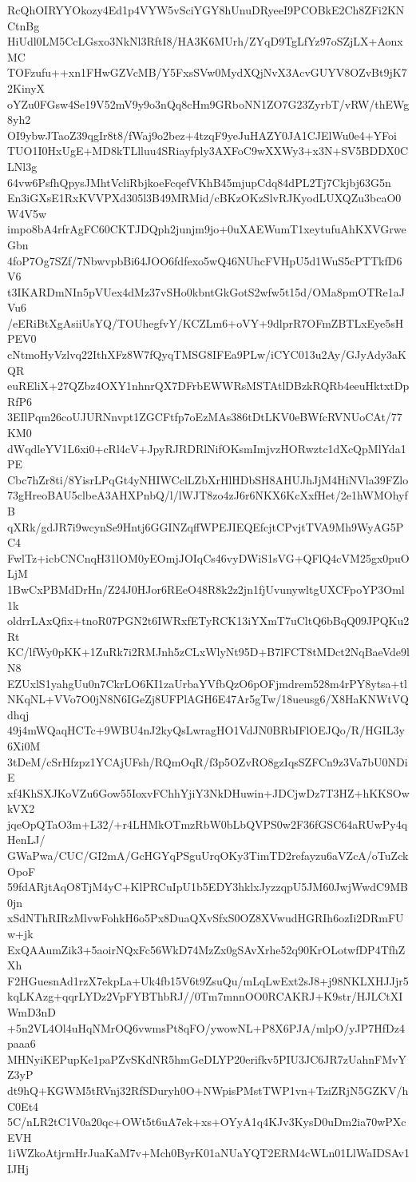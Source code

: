 RcQhOIRYYOkozy4Ed1p4VYW5vSciYGY8hUnuDRyeeI9PCOBkE2Ch8ZFi2KNCtnBg
HiUdl0LM5CcLGsxo3NkNl3RftI8/HA3K6MUrh/ZYqD9TgLfYz97oSZjLX+AonxMC
TOFzufu++xn1FHwGZVcMB/Y5FxsSVw0MydXQjNvX3AcvGUYV8OZvBt9jK72KinyX
oYZu0FGsw4Se19V52mV9y9o3nQq8cHm9GRboNN1ZO7G23ZyrbT/vRW/thEWg8yh2
OI9ybwJTaoZ39qgIr8t8/fWaj9o2bez+4tzqF9yeJuHAZY0JA1CJElWu0e4+YFoi
TUO1I0HxUgE+MD8kTLlluu4SRiayfply3AXFoC9wXXWy3+x3N+SV5BDDX0CLNl3g
64vw6PsfhQpysJMhtVcliRbjkoeFcqefVKhB45mjupCdq84dPL2Tj7Ckjbj63G5n
En3iGXsE1RxKVVPXd305l3B49MRMid/cBKzOKzSlvRJKyodLUXQZu3bcaO0W4V5w
impo8bA4rfrAgFC60CKTJDQph2junjm9jo+0uXAEWumT1xeytufuAhKXVGrweGbn
4foP7Og7SZf/7NbwvpbBi64JOO6fdfexo5wQ46NUhcFVHpU5d1WuS5cPTTkfD6V6
t3IKARDmNIn5pVUex4dMz37vSHo0kbntGkGotS2wfw5t15d/OMa8pmOTRe1aJVu6
/eERiBtXgAsiiUsYQ/TOUhegfvY/KCZLm6+oVY+9dlprR7OFmZBTLxEye5sHPEV0
cNtmoHyVzlvq22IthXFz8W7fQyqTMSG8IFEa9PLw/iCYC013u2Ay/GJyAdy3aKQR
euREliX+27QZbz4OXY1nhnrQX7DFrbEWWRsMSTAtlDBzkRQRb4eeuHktxtDpRfP6
3EIlPqm26coUJURNnvpt1ZGCFtfp7oEzMAs386tDtLKV0eBWfcRVNUoCAt/77KM0
dWqdleYV1L6xi0+cRl4cV+JpyRJRDRlNifOKsmImjvzHORwztc1dXcQpMlYda1PE
Cbc7hZr8ti/8YisrLPqGt4yNHIWCclLZbXrHlHDbSH8AHUJhJjM4HiNVla39FZlo
73gHreoBAU5clbeA3AHXPnbQ/l/lWJT8zo4zJ6r6NKX6KcXxfHet/2e1hWMOhyfB
qXRk/gdJR7i9wcynSe9Hntj6GGINZqffWPEJIEQEfcjtCPvjtTVA9Mh9WyAG5PC4
FwlTz+icbCNCnqH31lOM0yEOmjJOIqCs46vyDWiS1sVG+QFlQ4cVM25gx0puOLjM
1BwCxPBMdDrHn/Z24J0HJor6REeO48R8k2z2jn1fjUvunywltgUXCFpoYP3Oml1k
oldrrLAxQfix+tnoR07PGN2t6IWRxfETyRCK13iYXmT7uCltQ6bBqQ09JPQKu2Rt
KC/lfWy0pKK+1ZuRk7i2RMJnh5zCLxWlyNt95D+B7lFCT8tMDct2NqBaeVde9lN8
EZUxlS1yahgUu0n7CkrLO6KI1zaUrbaYVfbQzO6pOFjmdrem528m4rPY8ytsa+tl
NKqNL+VVo7O0jN8N6IGeZj8UFPlAGH6E47Ar5gTw/18ueusg6/X8HaKNWtVQdhqj
49j4mWQaqHCTc+9WBU4nJ2kyQsLwragHO1VdJN0BRbIFlOEJQo/R/HGIL3y6Xi0M
3tDeM/cSrHfzpz1YCAjUFsh/RQmOqR/f3p5OZvRO8gzIqsSZFCn9z3Va7bU0NDiE
xf4KhSXJKoVZu6Gow55IoxvFChhYjiY3NkDHuwin+JDCjwDz7T3HZ+hKKSOwkVX2
jqeOpQTaO3m+L32/+r4LHMkOTmzRbW0bLbQVPS0w2F36fGSC64aRUwPy4qHenLJ/
GWaPwa/CUC/GI2mA/GcHGYqPSguUrqOKy3TimTD2refayzu6aVZcA/oTuZckOpoF
59fdARjtAqO8TjM4yC+KlPRCuIpU1b5EDY3hklxJyzzqpU5JM60JwjWwdC9MB0jn
xSdNThRIRzMlvwFohkH6o5Px8DuaQXvSfxS0OZ8XVwudHGRIh6ozIi2DRmFUw+jk
ExQAAumZik3+5aoirNQxFc56WkD74MzZx0gSAvXrhe52q90KrOLotwfDP4TfhZXh
F2HGuesnAd1rzX7ekpLa+Uk4fb15V6t9ZsuQu/mLqLwExt2sJ8+j98NKLXHJJjr5
kqLKAzg+qqrLYDz2VpFYBThbRJ//0Tm7mnnOO0RCAKRJ+K9str/HJLCtXIWmD3nD
+5n2VL4Ol4uHqNMrOQ6vwmsPt8qFO/ywowNL+P8X6PJA/mlpO/yJP7HfDz4paaa6
MHNyiKEPupKe1paPZvSKdNR5hmGeDLYP20erifkv5PIU3JC6JR7zUahnFMvYZ3yP
dt9hQ+KGWM5tRVnj32RfSDuryh0O+NWpisPMstTWP1vn+TziZRjN5GZKV/hC0Et4
5C/nLR2tC1V0a20qc+OWt5t6uA7ek+xs+OYyA1q4KJv3KysD0uDm2ia70wPXcEVH
1iWZkoAtjrmHrJuaKaM7v+Mch0ByrK01aNUaYQT2ERM4cWLn01LlWaIDSAv1IJHj
